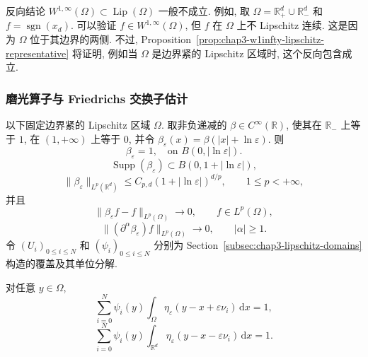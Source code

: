 反向结论 $W^{1,\infty}(\Omega)\subset\operatorname{Lip}(\Omega)$ 一般不成立. 例如, 取 $\Omega=\mathbb R_+^d\cup\mathbb R_-^d$ 和 $f=\operatorname{sgn}(x_d)$. 可以验证 $f\in W^{1,\infty}(\Omega)$, 但 $f$ 在 $\Omega$ 上不 Lipschitz 连续. 这是因为 $\Omega$ 位于其边界的两侧. 不过, Proposition~\ref{prop:chap3-w1infty-lipschitz-representative} 将证明, 例如当 $\Omega$ 是边界紧的 Lipschitz 区域时, 这个反向包含成立.

\subsubsection{磨光算子与 Friedrichs 交换子估计}
\label{subsec:chap3-mollifiers-friedrichs}

以下固定边界紧的 Lipschitz 区域 $\Omega$. 取非负递减的 $\beta\in C^\infty(\mathbb R)$, 使其在 $\mathbb R_-$ 上等于 $1$, 在 $(1,+\infty)$ 上等于 $0$, 并令 $\beta_\varepsilon(x)=\beta(|x|+\ln\varepsilon)$. 则
\[
 \beta_\varepsilon=1,\quad\text{on }B(0,|\ln\varepsilon|).
\]
\begin{equation}
 \operatorname{Supp}(\beta_\varepsilon)\subset B(0,1+|\ln\varepsilon|),
 \label{eq:chap3-beta-support}
\end{equation}
\begin{equation}
 \|\beta_\varepsilon\|_{L^p(\mathbb R^d)}\leq C_{p,d}(1+|\ln\varepsilon|)^{d/p},
 \qquad1\leq p<+\infty,
 \label{eq:chap3-beta-lp-bound}
\end{equation}
并且
\begin{equation}
 \|\beta_\varepsilon f-f\|_{L^p(\Omega)}\longrightarrow0,
 \qquad f\in L^p(\Omega),
 \label{eq:chap3-beta-convergence}
\end{equation}
\begin{equation}
 \|(\partial^\alpha\beta_\varepsilon)f\|_{L^p(\Omega)}\longrightarrow0,
 \qquad |\alpha|\geq1.
 \label{eq:chap3-beta-derivative-convergence}
\end{equation}
令 $(U_i)_{0\leq i\leq N}$ 和 $(\psi_i)_{0\leq i\leq N}$ 分别为 Section~\ref{subsec:chap3-lipschitz-domains} 构造的覆盖及其单位分解.

\begin{Lemma}
\label{lem:chap3-shifted-mollifier-partition}
对任意 $y\in\Omega$,
\begin{equation}
 \sum_{i=0}^N\psi_i(y)\int_\Omega\eta_\varepsilon(y-x+\varepsilon\nu_i)\,\mathrm dx=1,
 \label{eq:chap3-inward-kernel-partition}
\end{equation}
\begin{equation}
 \sum_{i=0}^N\psi_i(y)\int_{\mathbb R^d}\eta_\varepsilon(y-x-\varepsilon\nu_i)\,\mathrm dx=1.
 \label{eq:chap3-outward-kernel-partition}
\end{equation}
\end{Lemma}

